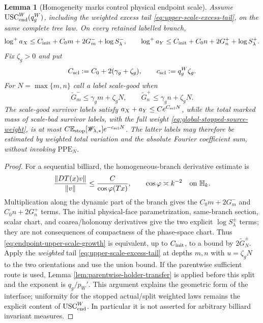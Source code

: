 \documentclass[11pt]{article}
\newtheorem{lemma}[theorem]{Lemma}
\begin{document}
\begin{lemma}[Homogeneity marks control physical endpoint scale]
\label{lem:endpoint-upper-scale}
Assume $\mathrm{USC}_{\rm end}^{W}(q_g^W)$, including the weighted excess
tail \eqref{eq:upper-scale-excess-tail}, on the same complete tree law.
On every retained labelled branch,
\begin{equation}
\label{eq:endpoint-upper-scale-growth}
 \log^+a_X\le C_{\rm init}+C_0m+2G_m^-+\log S_\lambda^-,
 \qquad
 \log^+a_Y\le C_{\rm init}+C_0n+2G_n^++\log S_\lambda^+.
\end{equation}
Fix $\zeta_g>0$ and put
\begin{equation}
\label{eq:scale-good-constants}
 C_{\rm scl}:=C_0+2(\gamma_g+\zeta_g),\qquad
 c_{\rm scl}:=q_g^W\zeta_g.
\end{equation}
For $N=\max\{m,n\}$ call a label scale-good when
\begin{equation}
\label{eq:weighted-scale-good-event}
 \widetilde G_m^-\le\gamma_gm+\zeta_gN,
 \qquad
 \widetilde G_n^+\le\gamma_gn+\zeta_gN.
\end{equation}
The scale-good survivor labels satisfy
$a_X+a_Y\le Ce^{C_{\rm scl}N}$, while the total marked mass of scale-bad
survivor labels, with the full weight \eqref{eq:global-stopped-source-weight}, is at most
$C\mathbb E_{\rm stop}[\mathscr W_{\lambda,*}]e^{-c_{\rm scl}N}$.  The latter
labels may therefore be estimated by weighted total variation and the
absolute Fourier coefficient sum, without invoking $\mathrm{PPE}_{N}$.
\end{lemma}

\begin{proof}
For a sequential billiard, the homogeneous-branch derivative estimate is
\cite{DLcones}
\[
 \frac{\|DT(x)v\|}{\|v\|}\le\frac{C}{\cos\varphi(Tx)},
 \qquad \cos\varphi\asymp k^{-2}\quad\hbox{on }\mathbb H_k.
\]
Multiplication along the dynamic part of the branch gives the $C_0m+2G_m^-$
and $C_0n+2G_n^+$ terms.  The initial physical-face parametrization,
same-branch section, scalar chart, and coarea/holonomy derivatives give the
two explicit $\log S_\lambda^\pm$ terms; they are not consequences of
compactness of the phase-space chart.  Thus
\eqref{eq:endpoint-upper-scale-growth} is equivalent, up to
$C_{\rm init}$, to a bound by $2\widetilde G_N^\pm$.  Apply the
\emph{weighted} tail \eqref{eq:upper-scale-excess-tail} at depths $m,n$ with
$u=\zeta_gN$ to the two orientations and use the union bound.  If the
parentwise sufficient route is used, Lemma
\ref{lem:parentwise-holder-transfer} is applied before this split and the
exponent is $q_g/p_W'$.  This
argument explains the geometric form of the interface; uniformity for the
stopped actual/split weighted laws remains the explicit content of
$\mathrm{USC}_{\rm end}^{W}$.  In particular it is not asserted for
arbitrary billiard invariant measures.
\end{proof}
\end{document}
